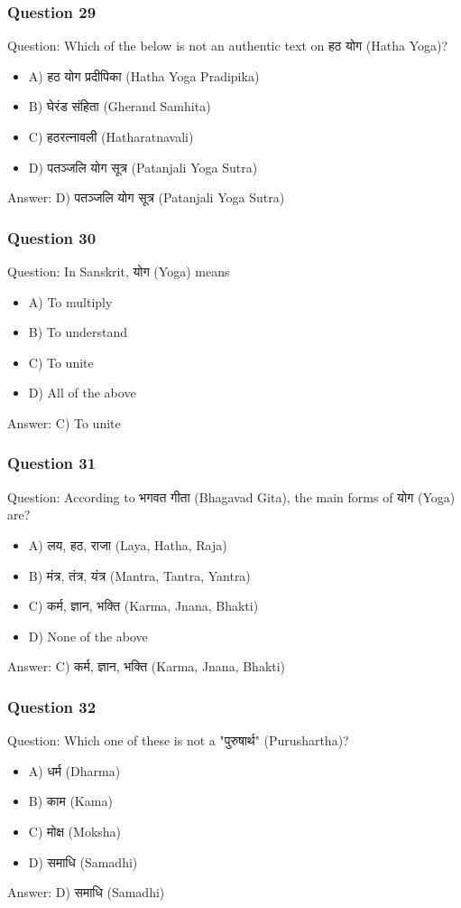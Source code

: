 \begin{frame}[fragile]\frametitle{Question 29}
Question: Which of the below is not an authentic text on हठ योग (Hatha Yoga)?
\begin{itemize}
\item A) हठ योग प्रदीपिका (Hatha Yoga Pradipika)
\item B) घेरंड संहिता (Gherand Samhita)
\item C) हठरत्नावली (Hatharatnavali)
\item D) पतञ्जलि योग सूत्र (Patanjali Yoga Sutra)
\end{itemize}
Answer: D) पतञ्जलि योग सूत्र (Patanjali Yoga Sutra)
\end{frame}

\begin{frame}[fragile]\frametitle{Question 30}
Question: In Sanskrit, योग (Yoga) means
\begin{itemize}
\item A) To multiply
\item B) To understand
\item C) To unite
\item D) All of the above
\end{itemize}
Answer: C) To unite
\end{frame}

\begin{frame}[fragile]\frametitle{Question 31}
Question: According to भगवत गीता (Bhagavad Gita), the main forms of योग (Yoga) are?
\begin{itemize}
\item A) लय, हठ, राजा (Laya, Hatha, Raja)
\item B) मंत्र, तंत्र, यंत्र (Mantra, Tantra, Yantra)
\item C) कर्म, ज्ञान, भक्ति (Karma, Jnana, Bhakti)
\item D) None of the above
\end{itemize}
Answer: C) कर्म, ज्ञान, भक्ति (Karma, Jnana, Bhakti)
\end{frame}

\begin{frame}[fragile]\frametitle{Question 32}
Question: Which one of these is not a "पुरुषार्थ" (Purushartha)?
\begin{itemize}
\item A) धर्म (Dharma)
\item B) काम (Kama)
\item C) मोक्ष (Moksha)
\item D) समाधि (Samadhi)
\end{itemize}
Answer: D) समाधि (Samadhi)
\end{frame}

